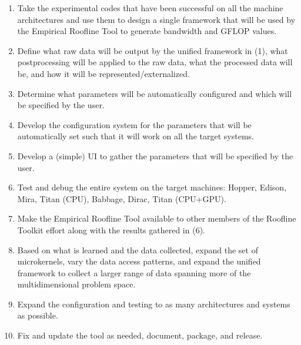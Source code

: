 \begin{enumerate}

\vspace{-0.1in}
\item{Take the experimental codes that have been successful on all the machine
      architectures and use them to design a single framework that will be
      used by the Empirical Roofline Tool to generate bandwidth and GFLOP
      values.}

\vspace{-0.1in}
\item{Define what raw data will be output by the unified framework in (1),
      what postprocessing will be applied to the raw data, what the processed
      data will be, and how it will be represented/externalized.}

\vspace{-0.1in}
\item{Determine what parameters will be automatically configured and which
      will be specified by the user.}

\vspace{-0.1in}
\item{Develop the configuration system for the parameters that will be
      automatically set such that it will work on all the target systems.}

\vspace{-0.1in}
\item{Develop a (simple) UI to gather the parameters that will be specified
      by the user.}

\vspace{-0.1in}
\item{Test and debug the entire system on the target machines:  Hopper, Edison,
      Mira, Titan (CPU), Babbage, Dirac, Titan (CPU+GPU).}

\vspace{-0.1in}
\item{Make the Empirical Roofline Tool available to other members of the
      Roofline Toolkit effort along with the results gathered in (6).}

\vspace{-0.1in}
\item{Based on what is learned and the data collected, expand the set of
      microkernels, vary the data access patterns, and expand the unified
      framework to collect a larger range of data spanning more of the
      multidimensional problem space.}

\vspace{-0.1in}
\item{Expand the configuration and testing to as many architectures and systems
      as possible.}

\vspace{-0.1in}
\item{Fix and update the tool as needed, document, package, and release.}

\end{enumerate}

